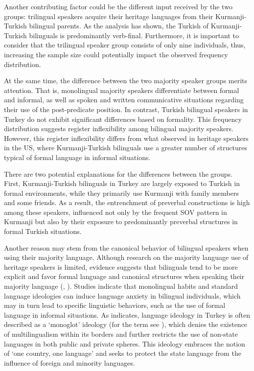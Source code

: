 Another contributing factor could be the different input received by the two groups: trilingual speakers acquire their heritage languages from their Kurmanji-Turkish bilingual parents. As the analysis has shown, the Turkish of Kurmanji-Turkish bilinguals is predominantly verb-final.  Furthermore, it is important to consider that the trilingual speaker group consists of only nine individuals, thus, increasing the sample size could potentially impact the observed frequency distribution.

At the same time, the difference between the two majority speaker groups merits attention. That is, monolingual majority speakers differentiate between formal and informal, as well as spoken and written communicative situations regarding their use of the post-predicate position. In contrast, Turkish bilingual speakers in Turkey do not exhibit significant differences based on formality. This frequency distribution suggests register inflexibility among bilingual majority speakers. However, this register inflexibility differs from what \citet{SchroederEtAl2024} observed in heritage speakers in the US, where Kurmanji-Turkish bilinguals use a greater number of structures typical of formal language in informal situations.

There are two potential explanations for the differences between the groups. First, Kurmanji-Turkish bilinguals in Turkey are largely exposed to Turkish in formal environments, while they primarily use Kurmanji with family members and some friends. As a result, the entrenchment of preverbal constructions is high among these speakers, influenced not only by the frequent SOV pattern in Kurmanji but also by their exposure to predominantly preverbal structures in formal Turkish situations.

Another reason may stem from the canonical behavior of bilingual speakers when using their majority language. Although research on the majority language use of heritage speakers is limited, evidence suggests that bilinguals tend to be more explicit and favor formal language and canonical structures when speaking their majority language (\citealt{SevincDewaele2018}, \citealt{Bunk2024, bunk_anxious_2025}). Studies indicate that monolingual habits and standard language ideologies can induce language anxiety in bilingual individuals, which may in turn lead to specific linguistic behaviors, such as the use of formal language in informal situations. As \citet{Bartholoma2021} indicates, language ideology in Turkey is often described as a `monoglot' ideology (for the term see \citealt{Silverstein1996}), which denies the existence of multilingualism within its borders and further restricts the use of non-state languages in both public and private spheres. This ideology embraces the notion of `one country, one language' and seeks to protect the state language from the influence of foreign and minority languages.

